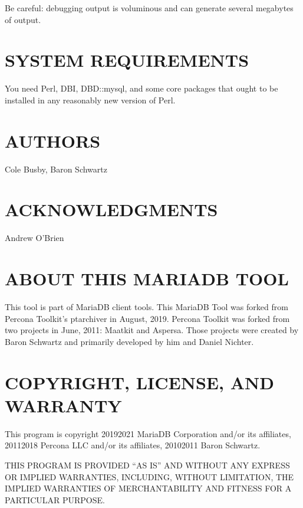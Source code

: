 \documentclass[letterpaper,10pt,english]{sphinxmanual}
\begin{document}
\sphinxAtStartPar
Be careful: debugging output is voluminous and can generate several megabytes
of output.


\section{SYSTEM REQUIREMENTS}
\label{\detokenize{mariadb-archiver:system-requirements}}
\sphinxAtStartPar
You need Perl, DBI, DBD::mysql, and some core packages that ought to be
installed in any reasonably new version of Perl.


\section{AUTHORS}
\label{\detokenize{mariadb-archiver:authors}}
\sphinxAtStartPar
Cole Busby, Baron Schwartz


\section{ACKNOWLEDGMENTS}
\label{\detokenize{mariadb-archiver:acknowledgments}}
\sphinxAtStartPar
Andrew O’Brien


\section{ABOUT THIS MARIADB TOOL}
\label{\detokenize{mariadb-archiver:about-this-mariadb-tool}}
\sphinxAtStartPar
This tool is part of MariaDB client tools. This MariaDB Tool was forked from
Percona Toolkit’s pt\sphinxhyphen{}archiver in August, 2019. Percona Toolkit was forked from two
projects in June, 2011: Maatkit and Aspersa.  Those projects were created by
Baron Schwartz and primarily developed by him and Daniel Nichter.


\section{COPYRIGHT, LICENSE, AND WARRANTY}
\label{\detokenize{mariadb-archiver:copyright-license-and-warranty}}
\sphinxAtStartPar
This program is copyright 2019\sphinxhyphen{}2021 MariaDB Corporation and/or its affiliates,
2011\sphinxhyphen{}2018 Percona LLC and/or its affiliates, 2010\sphinxhyphen{}2011 Baron Schwartz.

\sphinxAtStartPar
THIS PROGRAM IS PROVIDED “AS IS” AND WITHOUT ANY EXPRESS OR IMPLIED
WARRANTIES, INCLUDING, WITHOUT LIMITATION, THE IMPLIED WARRANTIES OF
MERCHANTABILITY AND FITNESS FOR A PARTICULAR PURPOSE.
\end{document}
